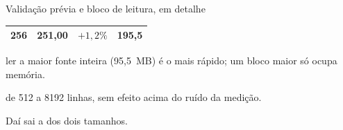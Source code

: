 \begin{frame}{Validação prévia e bloco de leitura, em detalhe}
\begin{minipage}[t]{0.60\textwidth}
\begin{tabular}{@{}r r r r@{}}
      256 & 251,00 & $+1{,}2\%$ & 195,5 \\
      \bottomrule
    \end{tabular}\par
    \smallskip
    \raggedright\footnotesize
     ler a maior fonte inteira (95,5~MB) é o mais rápido; um bloco maior
    só ocupa memória.\par
     de 512 a \num{8192} linhas, sem efeito acima do ruído da medição.\par
    \smallskip
    Daí sai a  dos dois tamanhos.\par
  \end{minipage}\par
  \vfill
\end{frame}

